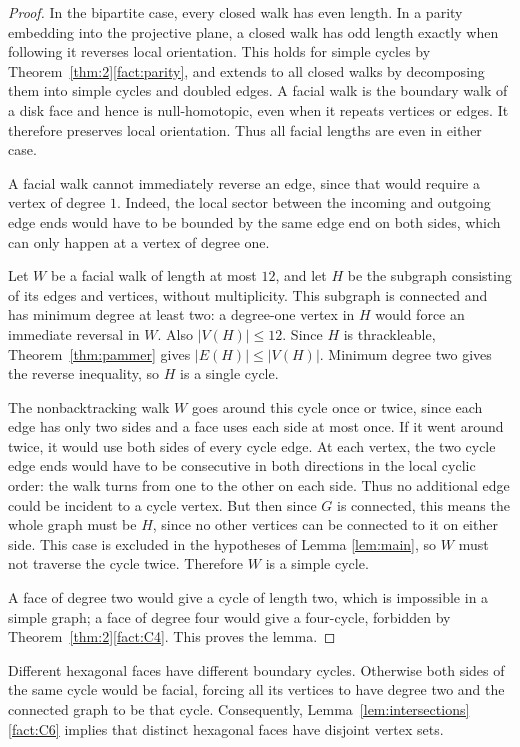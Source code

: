 \documentclass[11pt,a4paper]{article}
\begin{document}
\begin{proof}
In the bipartite case, every closed walk has even length. In a parity
embedding into the projective plane, a closed walk has odd length
exactly when following it reverses local orientation. This holds for
simple cycles by Theorem~\ref{thm:2}\ref{fact:parity}, and extends to
all closed walks by decomposing them into simple cycles and doubled
edges. A facial walk is the boundary walk of a disk face and hence is
null-homotopic, even when it repeats vertices or edges. It therefore
preserves local orientation. Thus all facial lengths are even in either case.

A facial walk cannot immediately reverse an edge, since that would
require a vertex of degree $1$.
Indeed, the local sector between the incoming and outgoing edge ends
would have to be bounded by the same edge end on both sides, which can
only happen at a vertex of degree one.

Let $W$ be a facial walk of length at most $12$, and let $H$ be the
subgraph consisting of its edges and vertices, without multiplicity.
This subgraph is connected and has minimum degree at least two: a
degree-one vertex in $H$ would force an immediate reversal in $W$.
Also $|V(H)|\le12$. Since $H$ is thrackleable,
Theorem~\ref{thm:pammer} gives $|E(H)|\le|V(H)|$. Minimum degree two
gives the reverse inequality, so $H$ is a single cycle.

The nonbacktracking walk $W$ goes around this cycle once or twice, since
each edge has only two sides and a face uses each side at most once.
If it went around twice, it would use both sides of every cycle edge.
At each vertex, the two cycle edge ends would have to be consecutive
in both directions in the local cyclic order: the walk turns from one
to the other on each side. Thus no additional edge could be incident
to a cycle vertex. But then since $G$ is connected, this means the whole graph must be $H$, since no other vertices can be connected to it on either side. This case is excluded in the hypotheses of Lemma \ref{lem:main}, so $W$ must not traverse the cycle twice. Therefore $W$ is a simple cycle.

A face of degree two would give a cycle of length two,
which is impossible in a simple graph; a face of degree four would give
a four-cycle, forbidden by Theorem~\ref{thm:2}\ref{fact:C4}. This proves the lemma.
\end{proof}

Different hexagonal faces have different boundary cycles. Otherwise both
sides of the same cycle would be facial, forcing all its vertices to
have degree two and the connected graph to be that cycle. Consequently,
Lemma~\ref{lem:intersections}\ref{fact:C6} implies that distinct hexagonal faces
have disjoint vertex sets.
\end{document}

